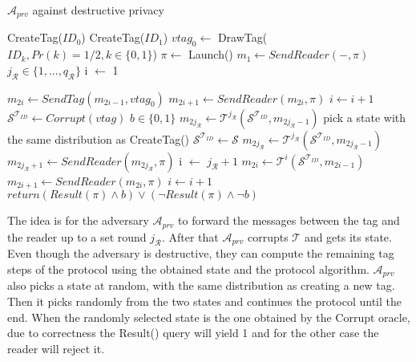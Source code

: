     \begin{algorithm}[H] %
        \centering
        \caption{$\mathcal{A}_{prv}$ against destructive privacy}
        \begin{algorithmic}[1] %
            \State CreateTag($ID_0$)
            \State CreateTag($ID_1$)
            \State $vtag_{0} \leftarrow$ DrawTag($ID_k, Pr(k)= 1/2, k \in \{0,1\}$)
            \State $\pi \leftarrow$ Launch() 
            \State $m_1 \leftarrow SendReader(-,\pi)$ 
            \State $j_{\mathcal{R}} \in \{1, \dots, q_\mathcal{R}\}$
            \State i $\leftarrow$ 1

                \State $m_{2i} \gets SendTag(m_{2i-1}, vtag_{0})$
                \State $m_{2i+1} \gets SendReader(m_{2i}, \pi)$
                \State $i \gets i+1$
            \EndWhile
            \State $\mathcal{S}^{\mathcal{T}_{ID}} \gets Corrupt(vtag)$
            \State $b \in \{0,1\}$
                \State $ m_{2j_{\mathcal{R}}} \gets \mathcal{T}^{j_{\mathcal{R}}}(\mathcal{S}^{\mathcal{T}_{ID}}, m_{2j_{\mathcal{R}}-1})$
            \Else
                \State pick a state with the same distribution as CreateTag()
                \State $\mathcal{S}^{\mathcal{T}_{ID}} \gets \mathcal{S}$
                \State $ m_{2j_{\mathcal{R}}} \gets \mathcal{T}^{j_{\mathcal{R}}}(\mathcal{S}^{\mathcal{T}_{ID}}, m_{2j_{\mathcal{R}}-1})$
            \EndIf
            \State $m_{2j_{\mathcal{R}}+1} \gets SendReader(m_{2j_{\mathcal{R}}}, \pi)$ 
            \State i $\leftarrow$ $j_{\mathcal{R}}+1$
                \State $m_{2i} \gets \mathcal{T}^{i}(\mathcal{S}^{\mathcal{T}_{ID}}, m_{2i-1})$
                \State $m_{2i+1} \gets SendReader(m_{2i}, \pi)$
                \State $i \gets i+1$
            \EndWhile       
            \State $return (Result(\pi) \land b) \lor (\lnot Result(\pi) \land \lnot b)$
        \end{algorithmic}
    \end{algorithm}

    The idea is for the adversary $\mathcal{A}_{prv}$ to forward the messages between the tag and the reader up to a set round $j_{\mathcal{R}}$. After that $\mathcal{A}_{prv}$
    corrupts $\mathcal{T}$ and gets its state. Even though the adversary is destructive, they can compute the remaining tag steps of the protocol using the 
    obtained state and the protocol algorithm. $\mathcal{A}_{prv}$ also picks a state at random, with the same distribution as creating a new tag. 
    Then it picks randomly from the two states and continues the protocol until the end. When the randomly selected state is the one obtained by the 
    Corrupt oracle, due to correctness the Result() query will yield 1 and for the other case the reader will reject it.


